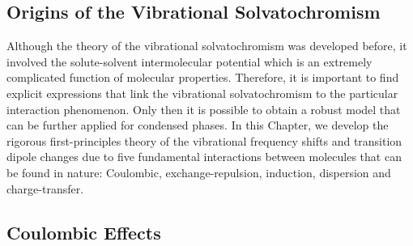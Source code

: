 \documentclass[a4paper,titlepage,twoside,fleqn,12pt]{book}
\begin{document}
\begin{refsection}
\chapter{Origins of the Vibrational Solvatochromism \label{c:my-model}}

Although the theory of the vibrational solvatochromism
was developed before, it involved the solute\hyp{}solvent
intermolecular potential which is an extremely complicated function
of molecular properties.
Therefore, it is important to find explicit 
expressions that link the vibrational solvatochromism
to the particular interaction phenomenon.
Only then it is possible to obtain a robust model
that can be further applied for condensed phases. 
In this Chapter, we develop the rigorous first\hyp{}principles
theory of the vibrational frequency shifts and transition
dipole changes due to five fundamental interactions
between molecules that can be found in nature: Coulombic, 
exchange\hyp{}repulsion, induction, dispersion and charge\hyp{}transfer.

\section{Coulombic Effects}


\end{refsection}
\end{document}
